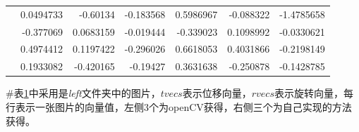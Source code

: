 \documentclass[UTF8]{ctexart}
\begin{document}
\begin{appendices}
\begin{table}[htbp]
\begin{tabular}{|c|r|r|r|r|r|r|}
\cmidrule{2-7}          & 0.0494733 & -0.60134 & -0.183568 & 0.5986967 & -0.088322 & -1.4785658 \\
\cmidrule{2-7}          & -0.377069 & 0.0683159 & -0.019444 & -0.339023 & 0.1098992 & -0.0330621 \\
\cmidrule{2-7}          & 0.4974412 & 0.1197422 & -0.296026 & 0.6618053 & 0.4031866 & -0.2198149 \\
\cmidrule{2-7}          & 0.1933082 & -0.420165 & -0.19427 & 0.3631638 & -0.250878 & -0.1428785 \\
    \bottomrule[2pt]
    \end{tabular}%
  \label{tab:camAndRt}%
\end{table}%
\end{appendices}
\#表\ref{tab:camAndRt}中采用是\textit{left}文件夹中的图片，$tvecs$表示位移向量，$rvecs$表示旋转向量，每行表示一张图片的向量值，左侧3个为openCV获得，右侧三个为自己实现的方法获得。
\end{document}

